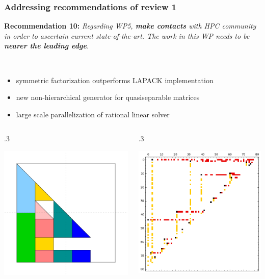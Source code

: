 \documentclass{beamer}
\begin{document}
\begin{frame}
\frametitle{Addressing recommendations of review 1}
    \textbf{Recommendation 10:} \textit{Regarding WP5, \textbf{make contacts} with HPC community in order to ascertain current state-of-the-art. The work in this WP needs to be \textbf{nearer the leading edge}.}

    \begin{description}
    \item<2-> [Leading edge achievements in linear algebra] \
      {\small
      \begin{itemize}
      \item symmetric factorization outperforms LAPACK implementation
      \item new non-hierarchical generator for quasiseparable matrices
      \item large scale parallelization of rational linear solver
      \end{itemize}
      }
    \begin{columns}
      \begin{column} {.3\textwidth}
        \begin{center}
          \includegraphics[width=.6\textwidth]{ARrec11}
      \end{center}
      \end{column}
      \begin{column} {.3\textwidth}
        \begin{center}
          \includegraphics[width=.6\textwidth]{Bruhat}

\end{center}
\end{column}
\end{columns}
\end{description}
\end{frame}
\end{document}
